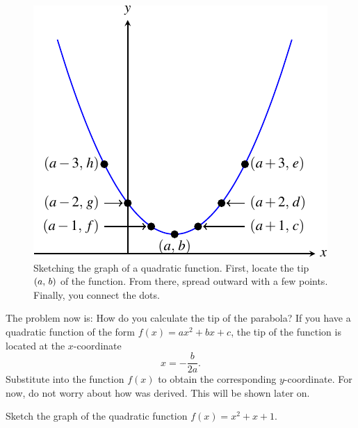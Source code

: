 \documentclass[a4paper,oneside,12pt]{article}
\begin{document}
\begin{figure}[!htbp]
\centering
\includegraphics[scale=1.2]{image/07/a1-bminus4-c10.pdf}
\caption{%
  Sketching the graph of a quadratic function.  First, locate the tip
  $\left\lparen{a},\, {b}\right\rparen$ of the function.  From there, spread outward with a
  few points.  Finally, you connect the dots.
}
\label{fig:sketch_parabola}
\end{figure}

The problem now is: How do you calculate the tip of the parabola?  If
you have a quadratic function of the form $f(x) = ax^2 + bx + c$, the
tip of the function is located at the $x$-coordinate
\begin{equation}
\label{eqn:parabola_tip_x_coordinate}
x
=
-\frac{b}{2a}.
\end{equation}
Substitute  into the
function $f(x)$ to obtain the corresponding $y$-coordinate.  For now,
do not worry about how  was
derived.  This will be shown later on.

\begin{example}
\label{ex:quadratic_graph_a1_b1_c1}
Sketch the graph of the quadratic function $f(x) = x^2 + x + 1$.
\end{example}
\end{document}
